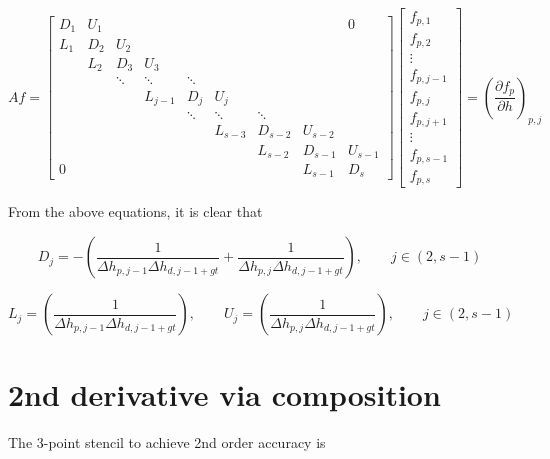 \documentclass[11pt]{article}
\begin{document}
\[
Af = 
\left[
\begin{array}{ccccccccc}
D_{1} & U_{1} &  &   &   &   &   &   & 0 \\
L_{1} & D_{2} & U_{2} &   &   &   &   &   &   \\
  & L_{2} & D_{3} & U_{3} &   &   &   &   &   \\
  &   & \ddots & \ddots & \ddots &   &   &   &   \\
  &   &   & L_{j-1} & D_{j} & U_{j} &   &   &   \\
  &   &   &   & \ddots & \ddots & \ddots &   &   \\
  &   &   &   &   & L_{s-3} & D_{s-2} & U_{s-2} &   \\
  &   &   &   &   &   & L_{s-2} & D_{s-1} & U_{s-1} \\
0 &   &   &   &   &   &   & L_{s-1} & D_{s}
\end{array}
\right]
\left[ \begin{array}{c}
f_{p,1} \\ f_{p,2} \\ \vdots \\ f_{p,j-1} \\ f_{p,j} \\ f_{p,j+1} \\ \vdots \\ f_{p,s-1} \\ f_{p,s}
\end{array} \right]
 = \left( \frac{\partial f_{p}}{\partial h} \right)_{p,j}
\]

From the above equations, it is clear that

\begin{equation}
  D_j = -\left( \frac{1}{\Delta h_{p,j-1} \Delta h_{d,j-1+gt}} + \frac{1}{\Delta h_{p,j} \Delta h_{d,j-1+gt}} \right), \qquad j \in (2,s-1)
\end{equation}

\begin{equation}
  L_j = \left( \frac{1}{\Delta h_{p,j-1} \Delta h_{d,j-1+gt}} \right), \qquad
  U_j = \left( \frac{1}{\Delta h_{p,j} \Delta h_{d,j-1+gt}} \right), \qquad j \in (2,s-1)
\end{equation}

\section{2nd derivative via composition}

The 3-point stencil to achieve 2nd order accuracy is
\end{document}
